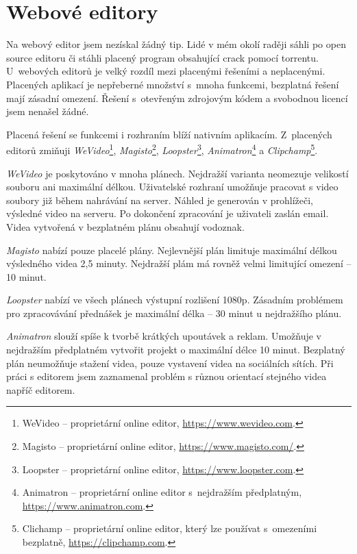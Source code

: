 \section{Webové editory}
Na webový editor jsem nezískal žádný tip. Lidé v mém okolí raději sáhli po open source editoru či stáhli placený program obsahující crack pomocí torrentu. U~webových editorů je velký rozdíl mezi placenými řešeními a neplacenými. Placených aplikací je nepřeberné množství s~mnoha funkcemi, bezplatná řešení mají zásadní omezení. Řešení s~otevřeným zdrojovým kódem a svobodnou licencí jsem nenašel žádné.

Placená řešení se funkcemi i rozhraním blíží nativním aplikacím. Z~placených editorů zmiňuji \textit{WeVideo}\footnote{WeVideo --  proprietární online editor, \url{https://www.wevideo.com}.}, \textit{Magisto}\footnote{Magisto -- proprietární online editor, \url{https://www.magisto.com/}.}, \textit{Loopster}\footnote{Loopster -- proprietární online editor, \url{https://www.loopster.com}.}, \textit{Animatron}\footnote{Animatron -- proprietární online editor s~nejdražším předplatným, \url{https://www.animatron.com}.} a \textit{Clipchamp}\footnote{Clichamp -- proprietární online editor, který lze používat s~omezeními bezplatně, \url{https://clipchamp.com}.}.

\textit{WeVideo} je poskytováno v mnoha plánech. Nejdražší varianta neomezuje velikostí souboru ani maximální délkou. Uživatelské rozhraní umožňuje pracovat s video soubory již během nahrávání na server. Náhled je generován v prohlížeči, výsledné video na serveru. Po dokončení zpracování je uživateli zaslán email. Videa vytvořená v bezplatném plánu obsahují vodoznak.

\textit{Magisto} nabízí pouze placelé plány. Nejlevnější plán limituje maximální délkou výsledného videa 2,5 minuty. Nejdražší plám má rovněž velmi limitující omezení -- 10 minut.

\textit{Loopster} nabízí ve všech plánech výstupní rozlišení 1080p. Zásadním problémem pro zpracovávání přednášek je maximální délka -- 30 minut u nejdražšího plánu.

\textit{Animatron} slouží spíše k tvorbě krátkých upoutávek a reklam. Umožňuje v nejdražším předplatném vytvořit projekt o maximální délce 10 minut. Bezplatný plán neumožňuje stažení videa, pouze vystavení videa na sociálních sítích. Při práci s editorem jsem zaznamenal problém s různou orientací stejného videa napříč editorem.

